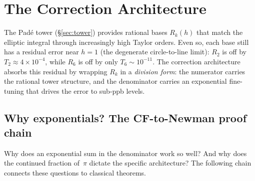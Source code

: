 \documentclass[12pt]{article}
\begin{document}
\section{The Correction Architecture}\label{sec:correction}

The Pad\'e tower (\S\ref{sec:tower}) provides rational bases $R_k(h)$ that match the elliptic integral through increasingly high Taylor orders.  Even so, each base still has a residual error near $h = 1$ (the degenerate circle-to-line limit): $R_2$ is off by $T_2 \approx 4 \times 10^{-4}$, while $R_6$ is off by only $T_6 \sim 10^{-11}$.  The correction architecture absorbs this residual by wrapping $R_k$ in a \emph{division form}: the numerator carries the rational tower structure, and the denominator carries an exponential fine-tuning that drives the error to sub-ppb levels.

\subsection{Why exponentials? The CF-to-Newman proof chain}\label{sec:cfchain}

Why does an exponential sum in the denominator work so well?  And why does the continued fraction
of~$\pi$ dictate the specific architecture?  The following chain connects these questions to
classical theorems.
\end{document}
